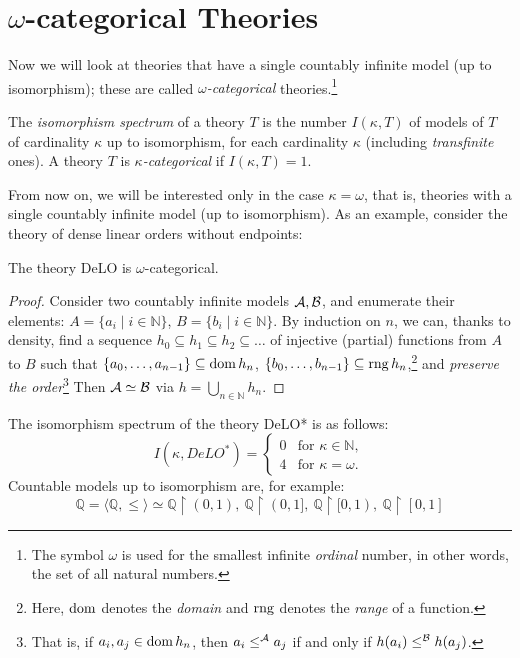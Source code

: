 \section{$\omega$-categorical Theories}\label{section:categoricity}

Now we will look at theories that have a single countably infinite model (up to isomorphism); these are called \emph{$\omega$-categorical} theories.\footnote{The symbol $\omega$ is used for the smallest infinite \emph{ordinal} number, in other words, the set of all natural numbers.}

\begin{definition}
    The \emph{isomorphism spectrum} of a theory $T$ is the number $
    I(\kappa,T)$ of models of $T$ of cardinality $\kappa$ up to isomorphism, for each cardinality $\kappa$ (including \emph{transfinite} ones). A theory $T$ is \emph{$\kappa$-categorical} if $
    I(\kappa,T)=1$.
\end{definition}

From now on, we will be interested only in the case $\kappa=\omega$, that is, theories with a single countably infinite model (up to isomorphism). As an example, consider the theory of dense linear orders without endpoints:

\begin{proposition}
    The theory DeLO is $\omega$-categorical.
\end{proposition}
\begin{proof}
Consider two countably infinite models $\mathcal{A}, \mathcal{B}$, and enumerate their elements: $A=\{a_i \mid i\in \mathbb{N}\}$, $B=\{b_i \mid i\in \mathbb{N}\}$. By induction on $n$, we can, thanks to density, find a sequence $h_0 \subseteq h_1 \subseteq h_2 \subseteq \dots$ of injective (partial) functions from $A$ to $B$ such that $\{a_0, \dots, a_{n-1}\} \subseteq \operatorname{dom} h_n$, $\{b_0, \dots, b_{n-1}\} \subseteq \operatorname{rng} h_n$,\footnote{Here, $\operatorname{dom}$ denotes the \emph{domain} and $\operatorname{rng}$ denotes the \emph{range} of a function.} and \emph{preserve the order}\footnote{That is, if $a_i, a_j \in \operatorname{dom} h_n$, then $a_i \leq^{\mathcal{A}} a_j$ if and only if $h(a_i) \leq^{\mathcal{B}} h(a_j)$.} Then $\mathcal{A} \simeq \mathcal{B}$ via $h = \bigcup_{n\in \mathbb{N}} h_n$.
\end{proof}

\begin{corollary}
The isomorphism spectrum of the theory DeLO* is as follows:
$$
I(\kappa, DeLO^*)=\begin{cases}
    0 &\text{for } \kappa \in \mathbb{N},\\
    4 &\text{for } \kappa = \omega.
\end{cases}
$$
Countable models up to isomorphism are, for example:
$$ 
\mathbb{Q} = \langle \mathbb{Q}, \leq \rangle \simeq \mathbb{Q} \upharpoonright (0,1), \ \mathbb{Q} \upharpoonright (0,1], \ \mathbb{Q} \upharpoonright [0,1), \ \mathbb{Q} \upharpoonright [0,1]
$$
\end{corollary}

